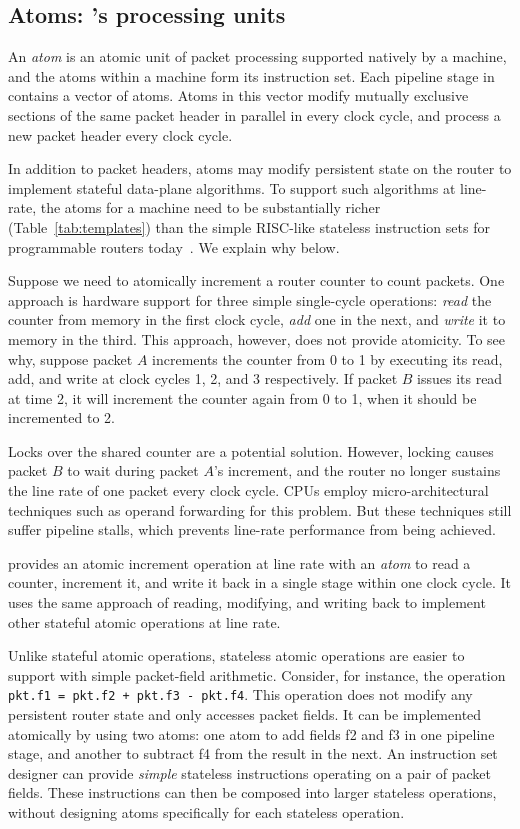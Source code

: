 \subsection{Atoms: \absmachine's processing units}
\label{ss:atoms}
 An {\em atom} is an atomic unit of packet processing supported natively by a
\absmachine machine, and the atoms within a \absmachine machine form its
instruction set. Each pipeline stage in \absmachine contains a vector of atoms.
Atoms in this vector modify mutually exclusive sections of the same packet
header in parallel in every clock cycle, and process a new packet header every
clock cycle.

In addition to packet headers, atoms may modify persistent state on the router
to implement stateful data-plane algorithms. To support such algorithms at
line-rate, the atoms for a \absmachine machine need to be substantially richer
(Table~\ref{tab:templates}) than the simple RISC-like stateless instruction
sets for programmable routers today~\cite{rmt}. We explain why below.

Suppose we need to atomically increment a router counter to count packets. One
approach is hardware support for three simple single-cycle operations:
\textit{read} the counter from memory in the first clock cycle, \textit{add}
one in the next, and \textit{write} it to memory in the third.  This approach,
however, does not provide atomicity. To see why, suppose packet $A$ increments
the counter from 0 to 1 by executing its read, add, and write at clock cycles
1, 2, and 3 respectively.  If packet $B$ issues its read at time 2, it will
increment the counter again from 0 to 1, when it should be incremented to 2.

Locks over the shared counter are a potential solution.  However, locking
causes packet $B$ to wait during packet $A$'s increment, and the router no
longer sustains the line rate of one packet every clock cycle. CPUs employ
micro-architectural techniques such as operand forwarding for this
problem. But these techniques still suffer pipeline stalls, which prevents
line-rate performance from being achieved.

\absmachine provides an atomic increment operation at line rate with an {\em
atom} to read a counter, increment it, and write it back in a single stage within
one clock cycle. It uses the same approach of reading, modifying, and writing
back to implement other stateful atomic operations at line rate.

Unlike stateful atomic operations, stateless atomic operations are easier to
support with simple packet-field arithmetic.  Consider, for
instance, the operation {\tt pkt.f1 = pkt.f2 + pkt.f3 - pkt.f4}.  This
operation does not modify any persistent router state and only accesses packet
fields. It can be implemented atomically by using two atoms: one atom to add
fields f2 and f3 in one pipeline stage, and another to subtract f4 from the
result in the next. An instruction set designer can provide {\em simple}
stateless instructions operating on a pair of packet fields. These instructions can then be
composed into larger stateless operations, without designing atoms specifically
for each stateless operation.

